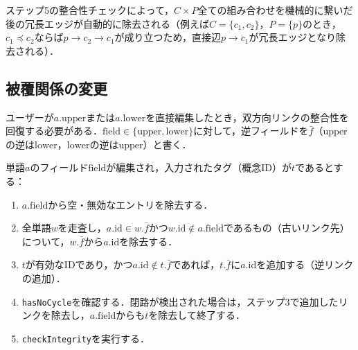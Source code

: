 \documentclass[../../main-detail.tex]{subfiles}
\begin{document}
ステップ5の整合性チェックによって，$C \times P$全ての組み合わせを機械的に繋いだ後の冗長エッジが自動的に除去される（例えば$C = \{c_1, c_2\}$，$P = \{p\}$のとき，$c_1 \preceq c_2$ならば$p \to c_2 \to c_1$が成り立つため，直接辺$p \to c_1$が冗長エッジとなり除去される）．

\subsection{被覆関係の変更}

ユーザーが$a.\mathrm{upper}$または$a.\mathrm{lower}$を直接編集したとき，双方向リンクの整合性を回復する必要がある．$\mathrm{field} \in \{\mathrm{upper}, \mathrm{lower}\}$に対して，逆フィールドを$\bar{f}$（$\mathrm{upper}$の逆は$\mathrm{lower}$，$\mathrm{lower}$の逆は$\mathrm{upper}$）と書く．

\begin{definition}
    単語$a$のフィールド$\mathrm{field}$が編集され，入力されたタグ（概念ID）が$t$であるとする：
    \begin{enumerate}
        \item $a.\mathrm{field}$から空・無効なエントリを除去する．
        \item 全単語$w$を走査し，$a.\mathrm{id} \in w.\bar{f}$かつ$w.\mathrm{id} \notin a.\mathrm{field}$であるもの（古いリンク先）について，$w.\bar{f}$から$a.\mathrm{id}$を除去する．
        \item $t$が有効なIDであり，かつ$a.\mathrm{id} \notin t.\bar{f}$であれば，$t.\bar{f}$に$a.\mathrm{id}$を追加する（逆リンクの追加）．
        \item \texttt{hasNoCycle}を確認する．閉路が検出された場合は，ステップ3で追加したリンクを除去し，$a.\mathrm{field}$からも$t$を除去して終了する．
        \item \texttt{checkIntegrity}を実行する．
    \end{enumerate}
\end{definition}
\end{document}
